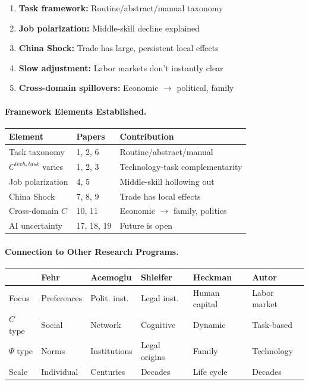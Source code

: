 \documentclass[12pt,a4paper]{article}
\begin{document}
\begin{enumerate}
  \item \textbf{Task framework:} Routine/abstract/manual taxonomy
  \item \textbf{Job polarization:} Middle-skill decline explained
  \item \textbf{China Shock:} Trade has large, persistent local effects
  \item \textbf{Slow adjustment:} Labor markets don't instantly clear
  \item \textbf{Cross-domain spillovers:} Economic $\to$ political, family
\end{enumerate}

\paragraph{Framework Elements Established.}

\begin{center}
\renewcommand{\arraystretch}{1.2}
\small
\begin{tabular}{lll}
\hline
\textbf{Element} & \textbf{Papers} & \textbf{Contribution} \\
\hline
Task taxonomy & 1, 2, 6 & Routine/abstract/manual \\
$C^{tech,task}$ varies & 1, 2, 3 & Technology-task complementarity \\
Job polarization & 4, 5 & Middle-skill hollowing out \\
China Shock & 7, 8, 9 & Trade has local effects \\
Cross-domain $C$ & 10, 11 & Economic $\to$ family, politics \\
AI uncertainty & 17, 18, 19 & Future is open \\
\hline
\end{tabular}
\end{center}

\paragraph{Connection to Other Research Programs.}

\begin{center}
\renewcommand{\arraystretch}{1.2}
\begin{tabular}{llllll}
\hline
& \textbf{Fehr} & \textbf{Acemoglu} & \textbf{Shleifer} & \textbf{Heckman} & \textbf{Autor} \\
\hline
Focus & Preferences & Polit. inst. & Legal inst. & Human capital & Labor market \\
$C$ type & Social & Network & Cognitive & Dynamic & Task-based \\
$\Psi$ type & Norms & Institutions & Legal origins & Family & Technology \\
Scale & Individual & Centuries & Decades & Life cycle & Decades \\
\hline
\end{tabular}
\end{center}
\end{document}
